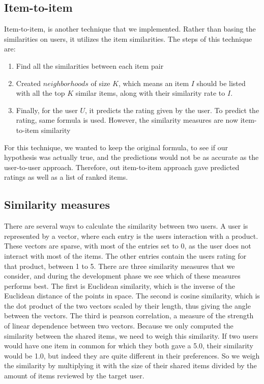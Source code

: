 \documentclass[11pt]{article}
\begin{document}
	\subsection{Item-to-item}
	Item-to-item, is another technique that we implemented. Rather than basing the similarities on users, it utilizes the item similarities. The steps of this technique are:
	\begin{enumerate}
		\item Find all the similarities between each item pair
		\item Created $neighborhoods$ of size $K$, which means an item $I$ should be listed with all the top $K$ similar items, along with their similarity rate to $I$.
		\item Finally, for the user $U$, it predicts the rating given by the user. To predict the rating, same formula is used. However, the similarity measures are now item-to-item similarity
	\end{enumerate}
	For this technique, we wanted to keep the original formula, to see if our hypothesis was actually true, and the predictions would not be as accurate as the user-to-user approach. Therefore, out item-to-item approach gave predicted ratings as well as a list of ranked items.
	
	
	\subsection{Similarity measures}
	There are several ways to calculate the similarity between two users. A user is represented by a vector, where each entry is the users interaction with a product. These vectors are sparse, with most of the entries set to 0, as the user does not interact with most of the items. The other entries contain the users rating for that product, between 1 to 5. There are three similarity measures that we consider, and during the development phase we see which of these measures performs best. The first is Euclidean similarity, which is the inverse of the Euclidean distance of the points in space. The second is cosine similarity, which is the dot product of the two vectors scaled by their length, thus giving the angle between the vectors. The third is pearson correlation, a measure of the strength of linear dependence between two vectors. Because we only computed the similarity between the shared items, we need to weigh this similarity. If two users would have one item in common for which they both gave a 5.0, their similarity would be 1.0, but indeed they are quite different in their preferences. So we weigh the similarity by multiplying it with the size of their shared items divided by the amount of items reviewed by the target user.
\end{document}
